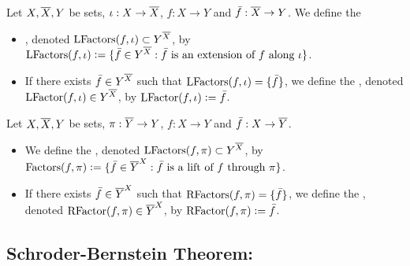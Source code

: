 \documentclass{book}
\begin{document}
	
	\begin{defn}
		Let $X, \overline{X}, Y$ be sets, $\iota:X \rightarrow \overline{X}$, $f:X \rightarrow Y$ and $\bar{f}: \overline{X} \rightarrow Y$. We define the 
		\begin{itemize}
			\item {}, denoted $\text{LFactors}(f, \iota) \subset Y^{\overline{X}}$, by $\text{LFactors}(f, \iota) \vcentcolon= \{\bar{f} \in Y^{\overline{X}}: \text{$\bar{f}$ is an extension of $f$ along $\iota$}\}$.
			\item If there exists $\bar{f} \in Y^{\overline{X}}$ such that $\text{LFactors}(f, \iota) = \{\bar{f}\}$, we define the , denoted $\text{LFactor}(f, \iota) \in Y^{\overline{X}}$, by $\text{LFactor}(f, \iota) \vcentcolon= \bar{f}$. 
		\end{itemize}
	\end{defn}
	
	\begin{defn}
		Let $X, \overline{X}, Y$ be sets, $\pi:\overline{Y} \rightarrow Y$, $f:X \rightarrow Y$ and $\bar{f}: X \rightarrow \overline{Y}$. 
		\begin{itemize}
			\item We define the , denoted $\text{LFactors}(f, \pi) \subset Y^{\overline{X}}$, by $\text{Factors}(f, \pi) \vcentcolon= \{\bar{f} \in {\overline{Y}}^X: \text{$\bar{f}$ is a lift of $f$ through $\pi$}\}$.
			\item If there exists $\bar{f} \in {\overline{Y}}^X$ such that $\text{RFactors}(f, \pi) = \{\bar{f}\}$, we define the , denoted $\text{RFactor}(f, \pi) \in {\overline{Y}}^X$, by $\text{RFactor}(f, \pi) \vcentcolon= \bar{f}$. 
		\end{itemize}
	\end{defn}
	
	
	
	
	
	
	
	
	
	
	
	
	
	
	
	
	
	
	
	
	
	
	
	
	
	
	\subsection{Schroder-Bernstein Theorem:}
	
\end{document}
